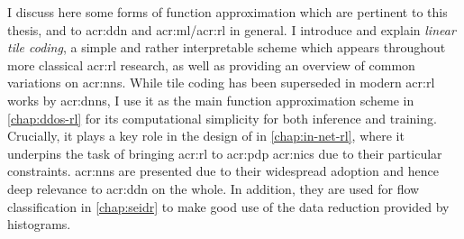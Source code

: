 I discuss here some forms of function approximation which are pertinent to this thesis, and to \gls{acr:ddn} and \gls{acr:ml}/\gls{acr:rl} in general.
I introduce and explain \emph{linear tile coding}, a simple and rather interpretable scheme which appears throughout more classical \gls{acr:rl} research, as well as providing an overview of common variations on \glspl{acr:nn}.
While tile coding has been superseded in modern \gls{acr:rl} works by \glspl{acr:dnn}, I use it as the main function approximation scheme in \cref{chap:ddos-rl} for its computational simplicity for both inference and training.
Crucially, it plays a key role in the design of \approachshort{} in \cref{chap:in-net-rl}, where it underpins the task of bringing \gls{acr:rl} to \gls{acr:pdp} \glspl{acr:nic} due to their particular constraints.
\glspl{acr:nn} are presented due to their widespread adoption and hence deep relevance to \gls{acr:ddn} on the whole.
In addition, they are used for flow classification in \cref{chap:seidr} to make good use of the data reduction provided by \seidr{} histograms.

%
%
%
%
%
%
%
%

